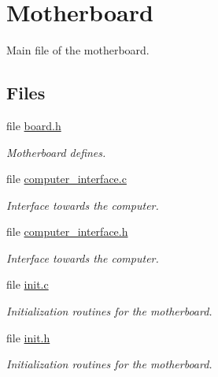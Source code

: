 \hypertarget{group__motherboard__group}{
\section{Motherboard}
\label{group__motherboard__group}
}
Main file of the motherboard.  


\subsection*{Files}
\begin{CompactItemize}
\item 
file \hyperlink{motherboard_2board_8h}{board.h}
\begin{CompactList}\small\item\em Motherboard defines. \item\end{CompactList}

\item 
file \hyperlink{motherboard_2computer__interface_8c}{computer\_\-interface.c}
\begin{CompactList}\small\item\em Interface towards the computer. \item\end{CompactList}

\item 
file \hyperlink{motherboard_2computer__interface_8h}{computer\_\-interface.h}
\begin{CompactList}\small\item\em Interface towards the computer. \item\end{CompactList}

\item 
file \hyperlink{motherboard_2init_8c}{init.c}
\begin{CompactList}\small\item\em Initialization routines for the motherboard. \item\end{CompactList}

\item 
file \hyperlink{motherboard_2init_8h}{init.h}
\begin{CompactList}\small\item\em Initialization routines for the motherboard. \item\end{CompactList}


\end{CompactItemize}
